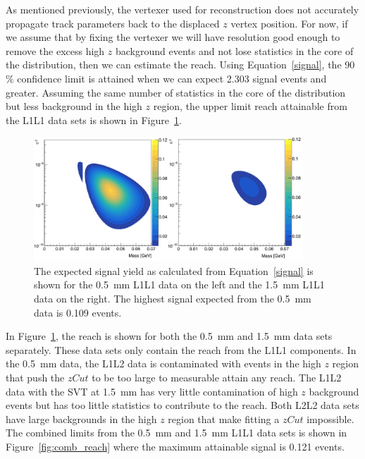 As mentioned previously, the vertexer used for reconstruction does not accurately propagate track parameters back to the displaced $z$ vertex position. For now, if we assume that by fixing the vertexer we will have resolution good enough to remove the excess high $z$ background events and not lose statistics in the core of the distribution, then we can estimate the reach. Using Equation~\eqref{signal}, the 90$\%$ confidence limit is attained when we can expect 2.303 signal events and greater. Assuming the same number of statistics in the core of the distribution but less background in the high $z$ region, the upper limit reach attainable from the L1L1 data sets is shown in Figure~\ref{fig:L1L1_reach}.

\begin{figure}[htb]
  \centering
      \includegraphics[width=0.9\textwidth]{pics/results/reach_sets.png}
  \caption[Expected signal yield for the individual L1L1 data sets]{The expected signal yield as calculated from Equation~\eqref{signal} is shown for the 0.5~mm L1L1 data on the left and the 1.5~mm L1L1 data on the right. The highest signal expected from the 0.5~mm data is 0.109 events.}
  \label{fig:L1L1_reach}
\end{figure} 

In Figure~\ref{fig:L1L1_reach}, the reach is shown for both the 0.5~mm and 1.5~mm data sets separately. These data sets only contain the reach from the L1L1 components. In the 0.5~mm data, the L1L2 data is contaminated with events in the high $z$ region that push the $zCut$ to be too large to measurable attain any reach. The L1L2 data with the SVT at 1.5~mm has very little contamination of high $z$ background events but has too little statistics to contribute to the reach. Both L2L2 data sets have large backgrounds in the high $z$ region that make fitting a $zCut$ impossible. \\
\indent The combined limits from the 0.5~mm and 1.5~mm L1L1 data sets is shown in Figure~\ref{fig:comb_reach} where the maximum attainable signal is 0.121 events. 

